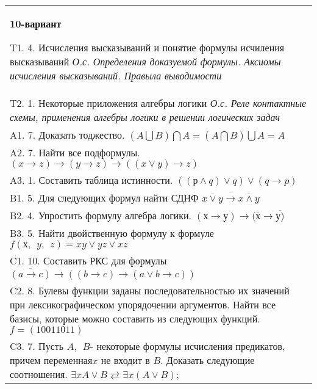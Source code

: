 \documentclass{article}
\begin{document}
\begin{tabular}{m{17cm}}
\textbf{10-вариант}
\newline

T1. 4. Исчисления высказываний и понятие формулы исчиления высказываний \emph{О.с. Определения доказуемой формулы. Аксиомы исчисления высказываний. Правыла выводимости} \\
T2. 1. Некоторые приложения алгебры логики \emph{О.с. Реле контактные схемы, применения алгебры логики в решении логических задач} \\
A1. 7. Доказать тоджество. \((A\bigcup B)\bigcap A = (A\bigcap B)\bigcup A = A\) \\
A2. 7. Найти все подформулы. \((x \rightarrow z) \rightarrow (y \rightarrow z) \rightarrow ((x \vee y) \rightarrow z)\) \\
A3. 1. Составить таблица истинности. \(\left( (р \land q) \vee q \right) \vee (q \rightarrow p)\) \\
B1. 5. Для следующих формул найти СДНФ \(\overline{\overline{x \vee y} \rightarrow \overline{x \land y}}\) \\
B2. 4. Упростить формулу алгебра логики. \((х \rightarrow у) \rightarrow (\overline{х} \rightarrow \overline{у)}\) \\
B3. 5. Найти двойственную формулу к формуле \(f(х,\ \ y,\ \ z) = xy \vee yz \vee xz\) \\
C1. 10. Составить РКС для формулы \(\overline{(a \rightarrow c)} \rightarrow \left( (b \rightarrow c) \rightarrow (a \vee b \rightarrow c) \right)\) \\
C2. 8. Булевы функции заданы последовательностью их значений при лексикографическом упорядочении аргументов. Найти все базисы, которые можно составить из следующих функций. \(f = (10011011)\) \\
C3. 7. Пусть \(A,\ \ B\)- некоторые формулы исчисления предикатов, причем переменная\(x\) не входит в \(B\). Доказать следующие соотношения. \(\exists xA \vee B \rightleftarrows \exists x(A \vee B)\); \\

\end{tabular}
\vspace{1cm}
\end{document}

